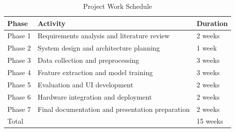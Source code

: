 \documentclass[12pt,a4paper]{report}
\begin{document}
\begin{table}[H]
\centering
\caption{Project Work Schedule}
\begin{tabular}{p{3cm}p{8cm}p{3cm}}
\toprule
\textbf{Phase} & \textbf{Activity} & \textbf{Duration}\\
\midrule
Phase 1 & Requirements analysis and literature review & 2 weeks\\
Phase 2 & System design and architecture planning & 1 week\\
Phase 3 & Data collection and preprocessing & 3 weeks\\
Phase 4 & Feature extraction and model training & 3 weeks\\
Phase 5 & Evaluation and UI development & 2 weeks\\
Phase 6 & Hardware integration and deployment & 2 weeks\\
Phase 7 & Final documentation and presentation preparation & 2 weeks\\
\midrule
Total & & 15 weeks\\
\bottomrule
\end{tabular}
\end{table}
\end{document}
